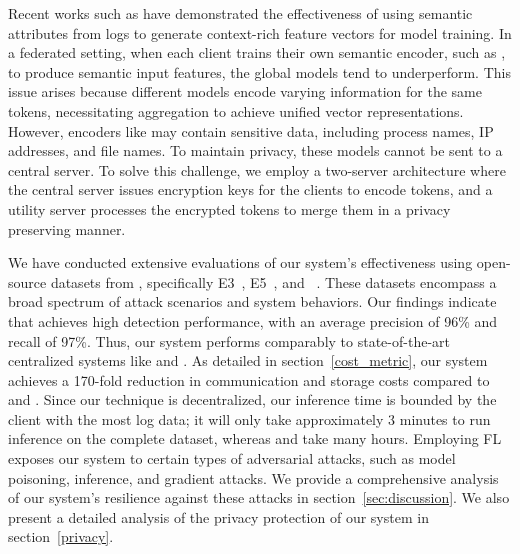 Recent works such as \flash have demonstrated the effectiveness of using semantic attributes from \logs logs to generate context-rich feature vectors for model training. In a federated setting, when each client trains their own semantic encoder, such as \wordvec, to produce semantic input features, the global \gnnshort models tend to underperform. This issue arises because different models encode varying information for the same tokens, necessitating aggregation to achieve unified vector representations. However, encoders like \wordvec may contain sensitive data, including process names, IP addresses, and file names. To maintain privacy, these models cannot be sent to a central server. To solve this challenge, we employ a two-server architecture where the central server issues encryption keys for the clients to encode \wordvec tokens, and a utility server processes the encrypted tokens to merge them in a privacy preserving manner.




We have conducted extensive evaluations of our system's effectiveness using open-source datasets from \darpa, specifically E3~\cite{darpae3}, E5~\cite{darpae5}, and \optc~\cite{anjum2021analyzing}. These datasets encompass a broad spectrum of attack scenarios and system behaviors. Our findings indicate that \Sys achieves high detection performance, with an average precision of 96\% and recall of 97\%. Thus, our system performs comparably to state-of-the-art centralized systems like \flash and \kairos. As detailed in section~\ref{cost_metric}, our system achieves a 170-fold reduction in communication and storage costs compared to \flash and \kairos. Since our technique is decentralized, our inference time is bounded by the client with the most log data; it will only take approximately 3 minutes to run inference on the complete \optc dataset, whereas \flash and \kairos take many hours. Employing FL exposes our system to certain types of adversarial attacks, such as model poisoning, inference, and gradient attacks. We provide a comprehensive analysis of our system's resilience against these attacks in section~\ref{sec:discussion}. We also present a detailed analysis of the privacy protection of our system in section~\ref{privacy}.

